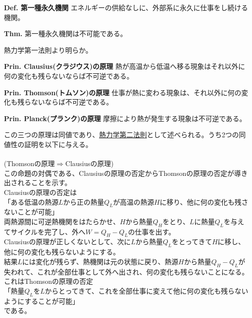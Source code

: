 \documentclass{jsarticle}
\begin{document}
\begin{itembox}[l]{\textbf{Def. 第一種永久機関}}
エネルギーの供給なしに、外部系に永久に仕事をし続ける機関。
\end{itembox}
\begin{itembox}[l]{\textbf{Thm.}}
第一種永久機関は不可能である。
\end{itembox}
熱力学第一法則より明らか。\\
\hypertarget{熱力学第二法則}{}
\hypertarget{Clausiusの原理}{}
\begin{itembox}[l]{\textbf{Prin. Clausius(クラジウス)の原理}}
熱が高温から低温へ移る現象はそれ以外に何の変化も残らないならば不可逆である。
\end{itembox}
\hypertarget{Thomsonの原理}{}
\begin{itembox}[l]{\textbf{Prin. Thomson(トムソン)の原理}}
仕事が熱に変わる現象は、それ以外に何の変化も残らないならば不可逆である。
\end{itembox}
\hypertarget{Plankの原理}{}
\begin{itembox}[l]{\textbf{Prin. Planck(プランク)の原理}}
摩擦により熱が発生する現象は不可逆である。
\end{itembox}
この三つの原理は同値であり、\underline{熱力学第二法則}として述べられる。うち2つの同値性の証明を以下に与える。\\
\\
(Thomsonの原理\(\Longrightarrow\)Clausiusの原理)\\
この命題の対偶である、Clausiusの原理の否定からThomsonの原理の否定が導き出されることを示す。\\
Clausiusの原理の否定は\\
「ある低温の熱源\(L\)から正の熱量\(Q_{L}\)が高温の熱源\(H\)に移り、他に何の変化も残さないことが可能」\\
両熱源間に可逆熱機関をはたらかせ、\(H\)から熱量\(Q_{H}\)をとり、\(L\)に熱量\(Q_{L}\)を与えてサイクルを完了し、外へ\(W=Q_{H}-Q_{L}\)の仕事を出す。\\
Clausiusの原理が正しくないとして、次に\(L\)から熱量\(Q_{L}\)をとってきて\(H\)に移し、他に何の変化も残らないようにする。\\
結果\(L\)には変化が残らず、熱機関は元の状態に戻り、熱源\(H\)から熱量\(Q_{H}-Q_{L}\)が失われて、これが全部仕事として外へ出され、何の変化も残らないことになる。これはThomsonの原理の否定\\
「熱量\(Q_{L}\)を\(L\)からとってきて、これを全部仕事に変えて他に何の変化も残らないようにすることが可能」\\
である。\\
\end{document}
